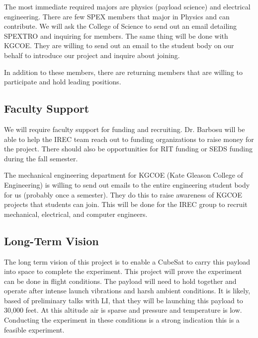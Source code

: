 \documentclass[conference]{IEEEtran} %
\begin{document}
The most immediate required majors are physics (payload science) and electrical engineering. There are few SPEX members that major in Physics and can contribute. We will ask the College of Science 
to send out an email detailing SPEXTRO and inquiring for members. The same thing will be done with KGCOE. They are willing to send out an email to the student body on our behalf to introduce 
our project and inquire about joining.

In addition to these members, there are returning members that are willing to participate and hold leading positions. 

\subsection{Faculty Support}
We will require faculty support for funding and recruiting. Dr. Barbosu will be able to help the IREC team reach out to funding organizations to raise money for the project. There should also be 
opportunities for RIT funding or SEDS funding during the fall semester. 

The mechanical engineering department for KGCOE (Kate Gleason College of Engineering) is willing to send out emails to the entire engineering student body for us (probably once a semester). They 
do this to raise awareness of KGCOE projects that students can join. This will be done for the IREC group to recruit mechanical, electrical, and computer engineers. 

\subsection{Long-Term Vision}
\label{sec:vision}
The long term vision of this project is to enable a CubeSat to carry this payload into space to complete the experiment. This project will prove the experiment can be done in flight conditions. 
The payload will need to hold together and operate after intense launch vibrations and harsh ambient conditions. It is likely, based of preliminary talks with LI, that they will be launching this 
payload to 30,000 feet. At this altitude air is sparse and pressure and temperature is low. Conducting the experiment in these conditions is a strong indication this is a feasible experiment. 
\end{document}

